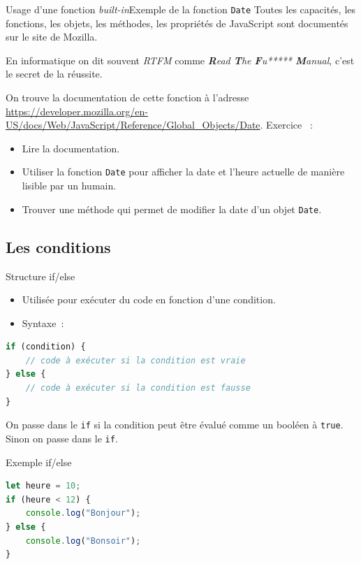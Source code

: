 \documentclass{beamer}
\begin{document}
\begin{frame}{Usage d'une fonction \textit{built-in}}{Exemple de la fonction \lstinline{Date}}
    Toutes les capacités, les fonctions, les objets, les méthodes, les propriétés de JavaScript sont documentés sur le site de Mozilla.
    \bigbreak
    \begin{dangercolorbox}
        En informatique on dit souvent \textit{RTFM} comme \textit{\textbf{R}ead \textbf{T}he \textbf{F}u***** \textbf{M}anual}, c'est le secret de la réussite.
    \end{dangercolorbox}
    \bigbreak
    On trouve la documentation de cette fonction à l'adresse \url{https://developer.mozilla.org/en-US/docs/Web/JavaScript/Reference/Global_Objects/Date}.
    \bigbreak
    Exercice \execcounterdispinc{}~:
    \begin{itemize}
        \item Lire la documentation.
        \item Utiliser la fonction \lstinline{Date} pour afficher la date et l'heure actuelle
              de manière lisible par un humain.
        \item Trouver une méthode qui permet de modifier la date d'un objet \lstinline{Date}.
    \end{itemize}
\end{frame}

\subsection{Les conditions}\label{subsec:conditions}

\begin{frame}[fragile]{Structure if/else}
    \begin{itemize}
        \item Utilisée pour exécuter du code en fonction d'une condition.
        \item Syntaxe~:
    \end{itemize}
    \begin{lstlisting}[language=JavaScript,title={\scriptsize{Script JavaScript}}]
if (condition) {
    // code à exécuter si la condition est vraie
} else {
    // code à exécuter si la condition est fausse
}
    \end{lstlisting}
    On passe dans le
    \lstinline{if} si la condition peut être évalué comme un booléen à \lstinline{true}.
    Sinon on passe dans le \lstinline{if}.
\end{frame}

\begin{frame}[fragile]{Exemple if/else}
    \begin{lstlisting}[language=JavaScript,title={\scriptsize{Script JavaScript}}]
let heure = 10;
if (heure < 12) {
    console.log("Bonjour");
} else {
    console.log("Bonsoir");
}
    \end{lstlisting}
\end{frame}
\end{document}
